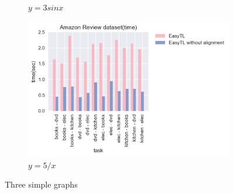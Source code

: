 \begin{figure}
\begin{subfigure}[b]{0.3\textwidth}
		\caption{$y=3sinx$}
		\label{fig:three sin x}
	\end{subfigure}
	\vfill
	\begin{subfigure}[b]{0.3\textwidth}
		\centering
		\includegraphics[width=\textwidth]{images/1_3.jpg}
		\caption{$y=5/x$}
		\label{fig:five over x}
	\end{subfigure}
	\caption{Three simple graphs}
	\label{fig:three graphs}
\end{figure}

